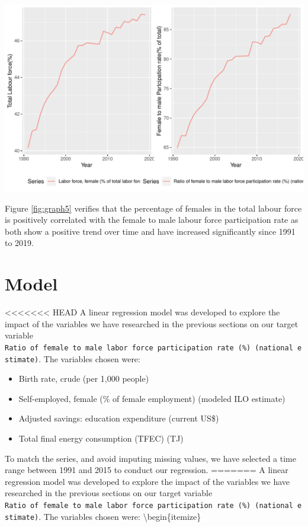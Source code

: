 \documentclass[11pt,a4paper,]{article}
\providecommand{\tightlist}{%
  \setlength{\itemsep}{0pt}\setlength{\parskip}{0pt}}
\let\origfigure\figure
\let\endorigfigure\endfigure
\renewenvironment{figure}[1][2] {
    \expandafter\origfigure\expandafter[H]
} {
    \endorigfigure
}%
\begin{document}
\begin{figure}
\centering
\includegraphics{report_files/figure-latex/graph5-1.pdf}
\caption{\label{fig:graph5}Comparing female labour force with female-male participation rate}
\end{figure}

Figure \ref{fig:graph5} verifies that the percentage of females in the total labour force is positively correlated with the female to male labour force participation rate as both show a positive trend over time and have increased significantly since 1991 to 2019.

\section*{Model}

<<<<<<< HEAD
A linear regression model was developed to explore the impact of the
variables we have researched in the previous sections on our target
variable
\texttt{Ratio\ of\ female\ to\ male\ labor\ force\ participation\ rate\ (\%)\ (national\ estimate)}.
The variables chosen were:

\begin{itemize}
\tightlist
\item
  Birth rate, crude (per 1,000 people)
\item
  Self-employed, female (\% of female employment) (modeled ILO estimate)
\item
  Adjusted savings: education expenditure (current US\$)
\item
  Total final energy consumption (TFEC) (TJ)
\end{itemize}

To match the series, and avoid imputing missing values, we have selected
a time range between 1991 and 2015 to conduct our regression.
=======
A linear regression model was developed to explore the impact of the variables we have researched in the previous sections on our target variable \texttt{Ratio\ of\ female\ to\ male\ labor\ force\ participation\ rate\ (\%)\ (national\ estimate)}. The variables chosen were:
\textbackslash{}begin\{itemize\}
\end{document}
